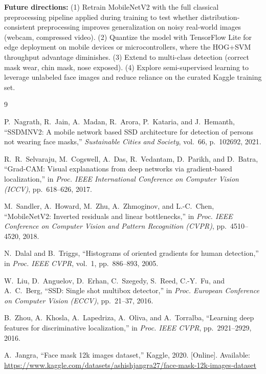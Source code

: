 \documentclass[11pt,a4paper]{article}
\begin{document}
\textbf{Future directions:}
(1) Retrain MobileNetV2 with the full classical preprocessing pipeline applied
during training to test whether distribution-consistent preprocessing improves
generalization on noisy real-world images (webcam, compressed video).
(2) Quantize the model with TensorFlow Lite for edge deployment on mobile
devices or microcontrollers, where the HOG+SVM throughput advantage diminishes.
(3) Extend to multi-class detection (correct mask wear, chin mask, nose exposed).
(4) Explore semi-supervised learning to leverage unlabeled face images and reduce
reliance on the curated Kaggle training set.

\begin{thebibliography}{9}

P.~Nagrath, R.~Jain, A.~Madan, R.~Arora, P.~Kataria, and J.~Hemanth,
``SSDMNV2: A mobile network based SSD architecture for detection of persons not
wearing face masks,''
\textit{Sustainable Cities and Society}, vol.~66, p.~102692, 2021.

R.~R.~Selvaraju, M.~Cogswell, A.~Das, R.~Vedantam, D.~Parikh, and D.~Batra,
``Grad-CAM: Visual explanations from deep networks via gradient-based
localization,''
in \textit{Proc. IEEE International Conference on Computer Vision (ICCV)},
pp.~618--626, 2017.

M.~Sandler, A.~Howard, M.~Zhu, A.~Zhmoginov, and L.-C.~Chen,
``MobileNetV2: Inverted residuals and linear bottlenecks,''
in \textit{Proc. IEEE Conference on Computer Vision and Pattern Recognition
(CVPR)}, pp.~4510--4520, 2018.

N.~Dalal and B.~Triggs,
``Histograms of oriented gradients for human detection,''
in \textit{Proc. IEEE CVPR}, vol.~1, pp.~886--893, 2005.

W.~Liu, D.~Anguelov, D.~Erhan, C.~Szegedy, S.~Reed, C.-Y.~Fu, and
A.~C.~Berg,
``SSD: Single shot multibox detector,''
in \textit{Proc. European Conference on Computer Vision (ECCV)},
pp.~21--37, 2016.

B.~Zhou, A.~Khosla, A.~Lapedriza, A.~Oliva, and A.~Torralba,
``Learning deep features for discriminative localization,''
in \textit{Proc. IEEE CVPR}, pp.~2921--2929, 2016.

A.~Jangra,
``Face mask 12k images dataset,''
Kaggle, 2020. [Online]. Available:
\url{https://www.kaggle.com/datasets/ashishjangra27/face-mask-12k-images-dataset}

\end{thebibliography}
\end{document}
